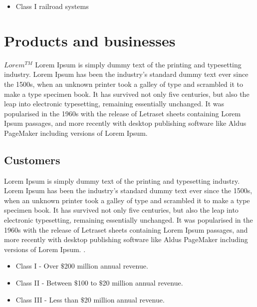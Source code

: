 \documentclass[12pt,a4paper]{report}
\begin{document}
\begin{itemize}
\item[] Class I railroad systems
\end{itemize}

\section{Products and businesses}

$Lorem^{TM}$ Lorem Ipsum is simply dummy text of the printing and typesetting industry. Lorem Ipsum has been the industry's standard dummy text ever since the 1500s, when an unknown printer took a galley of type and scrambled it to make a type specimen book. It has survived not only five centuries, but also the leap into electronic typesetting, remaining essentially unchanged. It was popularised in the 1960s with the release of Letraset sheets containing Lorem Ipsum passages, and more recently with desktop publishing software like Aldus PageMaker including versions of Lorem Ipsum.
\subsection*{Customers}
Lorem Ipsum is simply dummy text of the printing and typesetting industry. Lorem Ipsum has been the industry's standard dummy text ever since the 1500s, when an unknown printer took a galley of type and scrambled it to make a type specimen book. It has survived not only five centuries, but also the leap into electronic typesetting, remaining essentially unchanged. It was popularised in the 1960s with the release of Letraset sheets containing Lorem Ipsum passages, and more recently with desktop publishing software like Aldus PageMaker including versions of Lorem Ipsum. \cite{railroadClasses}.


\begin{itemize}
\item[] Class I  - Over $\$$200 million annual revenue.
\item[] Class II - Between $\$$100 to $\$$20 million annual revenue.
\item[] Class III - Less than $\$$20 million annual revenue.
\end{itemize}
\end{document}
